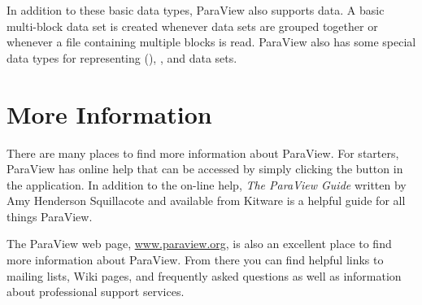 In addition to these basic data types, ParaView also supports
 data.  A basic multi-block data set is created
whenever data sets are grouped together or whenever a file containing
multiple blocks is read.  ParaView also has some special data types for
representing 
(), , and 
data sets.


\section{More Information}

There are many places to find more information about ParaView.  For
starters, ParaView has online help that can be accessed by simply clicking
the  button in the application.  In addition to the on-line
help, \emph{The ParaView Guide} written by Amy Henderson Squillacote and
available from Kitware is a helpful guide for all things ParaView.

The ParaView web page, \href{http://www.paraview.org}{www.paraview.org}, is
also an excellent place to find more information about ParaView.  From
there you can find helpful links to mailing lists, Wiki pages, and
frequently asked questions as well as information about professional
support services.



